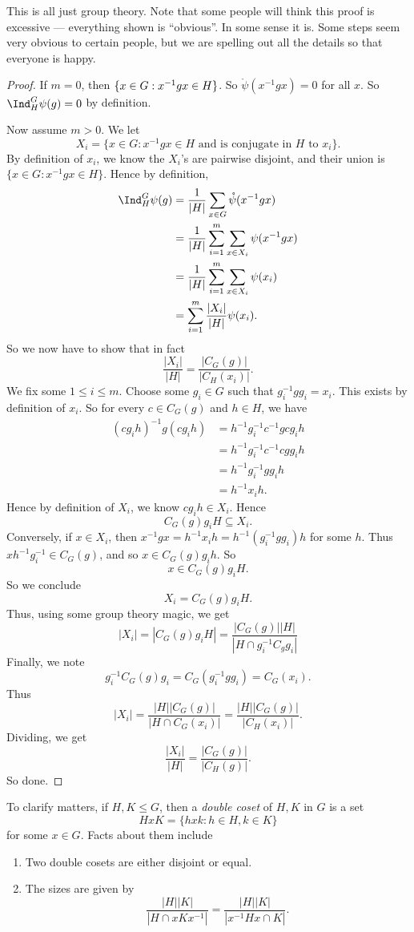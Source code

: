 \documentclass[a4paper]{article}
\begin{document}
This is all just group theory. Note that some people will think this proof is excessive --- everything shown is ``obvious''. In some sense it is. Some steps seem very obvious to certain people, but we are spelling out all the details so that everyone is happy.

\begin{proof}
  If $m = 0$, then $\{x \in G: x^{-1}gx \in H\} \empty$. So $\mathring{\psi}(x^{-1}gx) = 0$ for all $x$. So $\Ind_H^G \psi(g) = 0$ by definition.

  Now assume $m > 0$. We let
  \[
    X_i = \{x \in G: x^{-1}gx \in H\text{ and is conjugate in $H$ to $x_i$}\}.
  \]
  By definition of $x_i$, we know the $X_i$'s are pairwise disjoint, and their union is $\{x \in G: x^{-1}gx \in H\}$. Hence by definition,
  \begin{align*}
    \Ind_H^G \psi(g) &= \frac{1}{|H|} \sum_{x \in G} \mathring{\psi}(x^{-1}gx) \\
    &= \frac{1}{|H|}\sum_{i = 1}^m \sum_{x \in X_i} \psi(x^{-1}gx)\\
    &= \frac{1}{|H|}\sum_{i = 1}^m \sum_{x \in X_i} \psi(x_i)\\
    &= \sum_{i = 1}^m \frac{|X_i|}{|H|} \psi(x_i).
  \end{align*}
  So we now have to show that in fact
  \[
    \frac{|X_i|}{|H|} = \frac{|C_G(g)|}{|C_H(x_i)|}.
  \]
  We fix some $1 \leq i \leq m$. Choose some $g_i \in G$ such that $g_i^{-1} gg_i = x_i$. This exists by definition of $x_i$. So for every $c \in C_G(g)$ and $h \in H$, we have
  \begin{align*}
    (cg_i h)^{-1} g(cg_i h) &= h^{-1} g_i^{-1} c^{-1}gcg_i h \\
    &= h^{-1}g_i^{-1} c^{-1}cg g_ih \\
    &= h^{-1} g_i^{-1}gg_i h \\
    &= h^{-1} x_i h.
  \end{align*}
  Hence by definition of $X_i$, we know $cg_i h \in X_i$. Hence
  \[
    C_G(g) g_i H \subseteq X_i.
  \]
  Conversely, if $x \in X_i$, then $x^{-1}gx = h^{-1} x_i h = h^{-1}(g_i^{-1}g g_i) h$ for some $h$. Thus $xh^{-1}g_i^{-1} \in C_G(g)$, and so $x \in C_G(g) g_i h$. So
  \[
    x \in C_G(g) g_i H.
  \]
  So we conclude
  \[
    X_i = C_G(g) g_i H.
  \]
  Thus, using some group theory magic, we get
  \[
    |X_i| = |C_G(g) g_iH| = \frac{|C_G(g)||H|}{|H \cap g_i^{-1}C_g g_i|}
  \]
  Finally, we note
  \[
    g_i^{-1}C_G(g) g_i = C_G(g_i^{-1} gg_i) = C_G(x_i).
  \]
  Thus
  \[
    |X_i| = \frac{|H||C_G(g)|}{|H\cap C_G(x_i)|} = \frac{|H||C_G(g)|}{|C_H(x_i)|}.
  \]
  Dividing, we get
  \[
    \frac{|X_i|}{|H|} = \frac{|C_G(g)|}{|C_H(g)|}.
  \]
  So done.
\end{proof}
To clarify matters, if $H, K \leq G$, then a \emph{double coset} of $H, K$ in $G$ is a set
\[
  HxK = \{hxk: h \in H, k \in K\}
\]
for some $x \in G$. Facts about them include
\begin{enumerate}
  \item Two double cosets are either disjoint or equal.
  \item The sizes are given by
    \[
      \frac{|H||K|}{|H\cap xKx^{-1}|} = \frac{|H||K|}{|x^{-1}Hx \cap K|}.
    \]
\end{enumerate}
\end{document}
